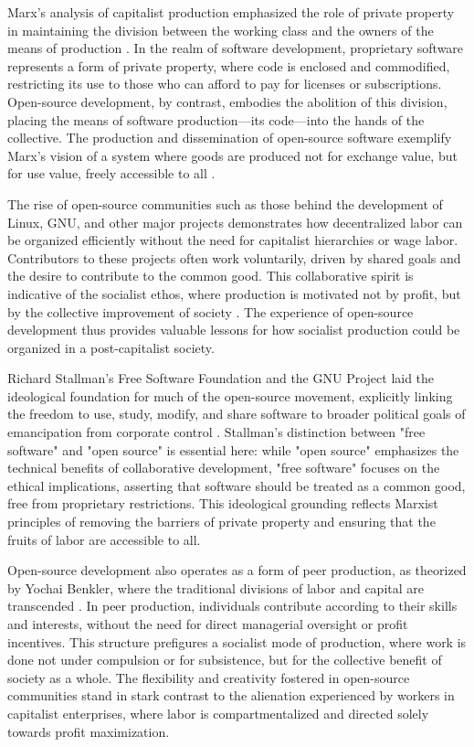 \begin{refsection}
Marx's analysis of capitalist production emphasized the role of private property in maintaining the division between the working class and the owners of the means of production \cite[pp.~273-274]{marx2008}. In the realm of software development, proprietary software represents a form of private property, where code is enclosed and commodified, restricting its use to those who can afford to pay for licenses or subscriptions. Open-source development, by contrast, embodies the abolition of this division, placing the means of software production—its code—into the hands of the collective. The production and dissemination of open-source software exemplify Marx’s vision of a system where goods are produced not for exchange value, but for use value, freely accessible to all \cite[pp.~43-45]{benkler2010}.

The rise of open-source communities such as those behind the development of Linux, GNU, and other major projects demonstrates how decentralized labor can be organized efficiently without the need for capitalist hierarchies or wage labor. Contributors to these projects often work voluntarily, driven by shared goals and the desire to contribute to the common good. This collaborative spirit is indicative of the socialist ethos, where production is motivated not by profit, but by the collective improvement of society \cite[pp.~77-78]{bollier2016}. The experience of open-source development thus provides valuable lessons for how socialist production could be organized in a post-capitalist society.

Richard Stallman’s Free Software Foundation and the GNU Project laid the ideological foundation for much of the open-source movement, explicitly linking the freedom to use, study, modify, and share software to broader political goals of emancipation from corporate control \cite[pp.~23-24]{stallman2010}. Stallman’s distinction between "free software" and "open source" is essential here: while "open source" emphasizes the technical benefits of collaborative development, "free software" focuses on the ethical implications, asserting that software should be treated as a common good, free from proprietary restrictions. This ideological grounding reflects Marxist principles of removing the barriers of private property and ensuring that the fruits of labor are accessible to all.

Open-source development also operates as a form of peer production, as theorized by Yochai Benkler, where the traditional divisions of labor and capital are transcended \cite[pp.~53-54]{benkler2010}. In peer production, individuals contribute according to their skills and interests, without the need for direct managerial oversight or profit incentives. This structure prefigures a socialist mode of production, where work is done not under compulsion or for subsistence, but for the collective benefit of society as a whole. The flexibility and creativity fostered in open-source communities stand in stark contrast to the alienation experienced by workers in capitalist enterprises, where labor is compartmentalized and directed solely towards profit maximization.


\end{refsection}
